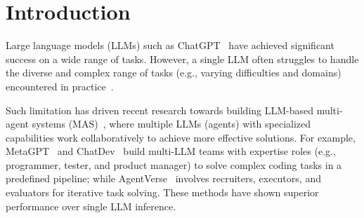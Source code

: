 \documentclass{article}
\theoremstyle{plain}
\theoremstyle{definition}
\theoremstyle{remark}
\begin{document}
\printAffiliationsAndNotice{\icmlPrimaryContributor}


\begin{abstract}
LLM-based multi-agent systems (MAS) have shown significant potential in tackling diverse tasks.
However, to design effective MAS, existing approaches heavily rely on manual configurations or multiple calls of advanced LLMs, resulting in inadaptability and high inference costs.
In this paper, we simplify the process of building an MAS by reframing it as a generative language task, where the input is a user query and the output is a corresponding MAS.
To address this novel task, we unify the representation of MAS as executable code and propose a consistency-oriented data construction pipeline to create a high-quality dataset comprising coherent and consistent query-MAS pairs.
Using this dataset, we train MAS-GPT, an open-source medium-sized LLM that is capable of generating query-adaptive MAS within a single LLM inference. The generated MAS can be seamlessly applied to process user queries and deliver high-quality responses. Extensive experiments on 9 benchmarks and 5 LLMs show that the proposed MAS-GPT consistently outperforms 10+ baseline MAS methods on diverse settings, indicating MAS-GPT's high effectiveness, efficiency and strong generalization ability.
Code will be available at \href{https://github.com/rui-ye/MAS-GPT}{https://github.com/rui-ye/MAS-GPT}.
\end{abstract}

\section{Introduction}
\label{sec:intro}

Large language models (LLMs) such as ChatGPT~\cite{ouyang2022training,openai2023gpt4} have achieved significant success on a wide range of tasks.
However, a single LLM often struggles to handle the diverse and complex range of tasks (e.g., varying difficulties and domains) encountered in practice~\cite{hongmetagpt,chen2023agentverse}.

Such limitation has driven recent research towards building LLM-based multi-agent systems (MAS)~\cite{qian2024chatdev,chen2023agentverse,liu2024dynamic}, where multiple LLMs (agents) with specialized capabilities work collaboratively to achieve more effective solutions.
For example, MetaGPT~\cite{hongmetagpt} and ChatDev~\cite{qian2024chatdev} build multi-LLM teams with expertise roles (e.g., programmer, tester, and product manager) to solve complex coding tasks in a predefined pipeline; while AgentVerse~\cite{chen2023agentverse} involves recruiters, executors, and evaluators for iterative task solving.
These methods have shown superior performance over single LLM inference.
\end{document}
